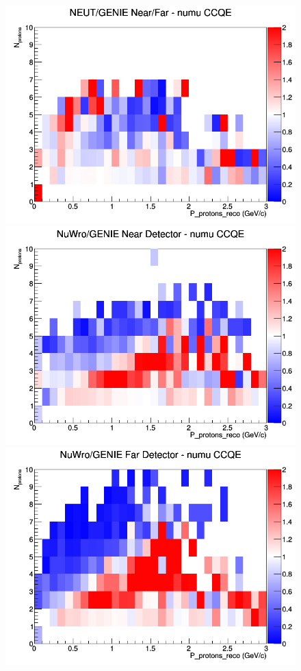 \documentclass[12pt]{article}
\begin{document}
\begin{figure}[h]
\endminipage
{}
\includegraphics[width=\linewidth]{eff_N_P/FGT/protons/ratios/CCQE_NEUT_GENIE_numu_NF_N_P.png}
\endminipage
\newline
{}
\includegraphics[width=\linewidth]{eff_N_P/FGT/protons/ratios/CCQE_NuWro_GENIE_numu_near_N_P.png}
\endminipage
{}
\includegraphics[width=\linewidth]{eff_N_P/FGT/protons/ratios/CCQE_NuWro_GENIE_numu_far_N_P.png}

\end{figure}
\end{document}
